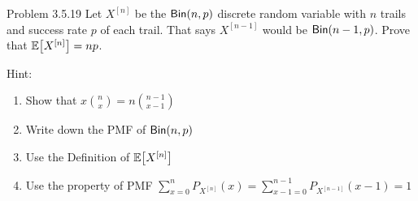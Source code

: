 \begin{problem}{Problem 3.5.19}
    Let $X^{[n]}$ be the $\operatorname{\mathsf{Bin}}(n, p)$ discrete random variable with $n$ trails and success rate $p$ of each trail. That says $X^{[n-1]}$ would be $\operatorname{\mathsf{Bin}}(n-1, p)$. Prove that $\E{X^{[n]}}=np$.

    Hint:{
        \begin{enumerate}
            \item Show that $x\binom{n}{x}=n\binom{n-1}{x-1}$
            \item Write down the PMF of $\operatorname{\mathsf{Bin}}(n, p)$
            \item Use the Definition of $\E{X^{[n]}}$
            \item Use the property of PMF $\sum_{x=0}^{n}P_{X^{[n]}}(x)=\sum_{x-1=0}^{n-1}P_{X^{[n-1]}}(x-1)=1$
        \end{enumerate}
    }
\end{problem}
